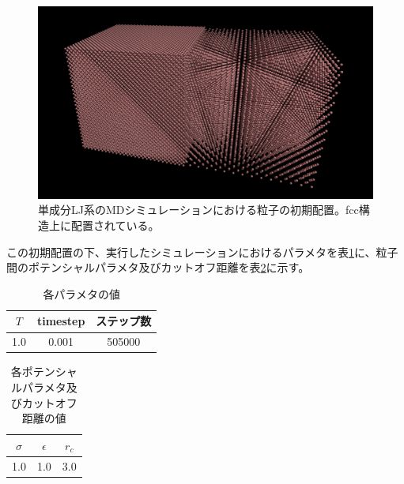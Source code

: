 \documentclass[titlepage]{jsreport}
\begin{document}
\begin{figure}[htbp]
    \begin{center}
        \includegraphics[width=14cm]{fig/ln78732-rn10976-ld0.629856-rd0.087808/ln78732-rn10976-ld0.629856-rd0.087808-first.png}
    \end{center}
    \caption{単成分LJ系のMDシミュレーションにおける粒子の初期配置。fcc構造上に配置されている。}
    \label{fig:ln78732-rn10976-ld0.629856-rd0.087808-first}
\end{figure}

\newpage
この初期配置の下、実行したシミュレーションにおけるパラメタを表\ref{table:mono-component-parameter}に、粒子間のポテンシャルパラメタ及びカットオフ距離を表\ref{table:mono-component-potential-parameter}に示す。

\begin{table}[htbp]
    \begin{center}
        \caption{各パラメタの値}
        \label{table:mono-component-parameter}
            \begin{tabular}{c c c}
                $T$ & timestep & ステップ数 \\
                \hline
                1.0 & 0.001 & 505000 \\
            \end{tabular}
    \end{center}
\end{table}

\begin{table}[htbp]
    \begin{center}
        \caption{各ポテンシャルパラメタ及びカットオフ距離の値}
        \label{table:mono-component-potential-parameter}
            \begin{tabular}{c c c}
                $\sigma$ & $\epsilon$ & $r_c$ \\
                \hline
                1.0 & 1.0 & 3.0\\
            \end{tabular}
    \end{center}
\end{table}
\end{document}
